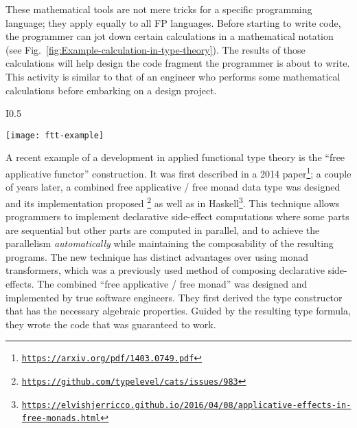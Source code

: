 These mathematical tools are not mere tricks for a specific programming
language; they apply equally to all FP languages. Before starting
to write code, the programmer can jot down certain calculations in
a mathematical notation (see Fig.\ \ref{fig:Example-calculation-in-type-theory}).
The results of those calculations will help design the code fragment
the programmer is about to write. This activity is similar to that
of an engineer who performs some mathematical calculations before
embarking on a design project. \begin{wrapfigure}{I}{0.5\textwidth}%
\begin{centering}
{\footnotesize{}\vspace{0.25\baselineskip}
\texttt{[image: ftt-example]}\vspace{-0.25\baselineskip}
}{\footnotesize\par}
\par\end{centering}
{\footnotesize{}\caption{A programmer performs a derivation before writing Haskell code.\label{fig:Example-calculation-in-type-theory}}
}{\footnotesize\par}

\vspace{-0.5\baselineskip}
\end{wrapfigure}%
 

A recent example of a development in applied functional type theory
is the \textsf{``}free applicative functor\textsf{''} construction. It was first described
in a 2014 paper\footnote{\texttt{\href{https://arxiv.org/pdf/1403.0749.pdf}{https://arxiv.org/pdf/1403.0749.pdf}}};
a couple of years later, a combined free applicative / free monad
data type was designed and its implementation proposed \footnote{\texttt{\href{https://github.com/typelevel/cats/issues/983}{https://github.com/typelevel/cats/issues/983}}}
as well as in Haskell\footnote{\texttt{\href{https://elvishjerricco.github.io/2016/04/08/applicative-effects-in-free-monads.html}{https://elvishjerricco.github.io/2016/04/08/applicative-effects-in-free-monads.html}}}.
This technique allows programmers to implement declarative side-effect
computations where some parts are sequential but other parts are computed
in parallel, and to achieve the parallelism \emph{automatically} while
maintaining the composability of the resulting programs. The new technique
has distinct advantages over using monad transformers, which was a
previously used method of composing declarative side-effects. The
combined \textsf{``}free applicative / free monad\textsf{''} was designed and implemented
by true software engineers. They first derived the type constructor
that has the necessary algebraic properties. Guided by the resulting
type formula, they wrote the code that was guaranteed to work.

